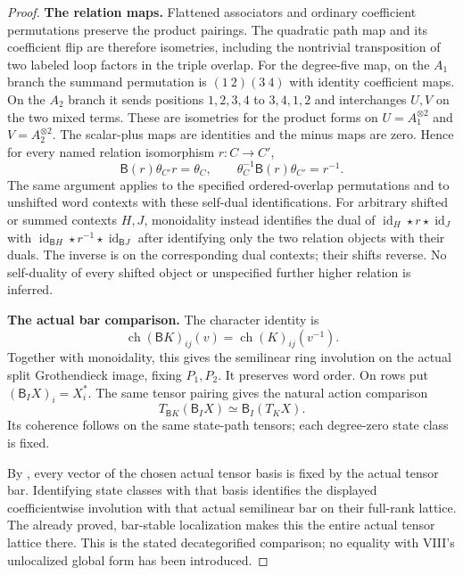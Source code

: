 \begin{proof}
\par\smallskip\noindent\textbf{The relation maps.}\quad
Flattened associators and ordinary coefficient permutations
preserve the product pairings. The quadratic path map and
its coefficient flip are therefore isometries, including
the nontrivial transposition of two labeled loop factors
in the triple overlap.
For the degree-five map, on the $A_1$ branch the summand
permutation is $(1\ 2)(3\ 4)$ with identity coefficient maps.
On the $A_2$ branch it sends positions $1,2,3,4$ to
$3,4,1,2$ and interchanges $U,V$ on the two mixed terms.
These are isometries for the product forms on
$U=A_1^{\otimes2}$ and $V=A_2^{\otimes2}$.
The scalar-plus maps are identities and the minus maps
are zero. Hence for every named relation isomorphism
$r:C\to C'$,
\[
 \mathsf B(r)\theta_{C'}r=\theta_C,
 \qquad
 \theta_C^{-1}\mathsf B(r)\theta_{C'}=r^{-1}.
\]
The same argument applies to the specified ordered-overlap
permutations and to unshifted word contexts with these
self-dual identifications. For arbitrary shifted or summed
contexts $H,J$, monoidality instead identifies the dual
of $\operatorname{id}_H\star r\star\operatorname{id}_J$
with $\operatorname{id}_{\mathsf B H}\star r^{-1}
\star\operatorname{id}_{\mathsf B J}$ after identifying only
the two relation objects with their duals. The inverse is
on the corresponding dual contexts; their shifts reverse.
No self-duality of every shifted object or unspecified
further higher relation is inferred.

\par\smallskip\noindent\textbf{The actual bar comparison.}\quad
The character identity is
\[
 \operatorname{ch}(\mathsf B K)_{ij}(v)
       =\operatorname{ch}(K)_{ij}(v^{-1}).
\]
Together with monoidality, this gives the semilinear
ring involution on the actual split Grothendieck image,
fixing $P_1,P_2$. It preserves word order.
On rows put $(\mathsf B_I X)_i=X_i^*$.
The same tensor pairing gives the natural action comparison
\[
 T_{\mathsf B K}(\mathsf B_I X)
        \simeq\mathsf B_I(T_K X).
\]
Its coherence follows on the same state-path tensors;
each degree-zero state class is fixed.

By , every vector of the chosen actual tensor
basis is fixed by the actual tensor bar. Identifying
state classes with that basis identifies the displayed
coefficientwise involution with that actual semilinear
bar on their full-rank lattice. The already proved,
bar-stable localization makes this the entire actual
tensor lattice there. This is the stated decategorified
comparison; no equality with VIII's unlocalized global
form has been introduced.
\end{proof}

